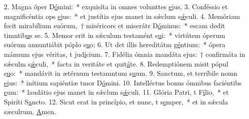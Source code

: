 2. Magna óper D\uline{ó}mini:~* exquisíta in omnes volunttes \uline{e}jus.
3. Conféssio et magnificéntia ops \uline{e}jus:~* et justítia ejus manet in sǽclum s\uline{ǽ}culi.
4. Memóriam fecit mirabílium suórum,~† miséricors et miserátr D\uline{ó}minus:~* escam dedit timntib\uline{u}s se.
5. Memor erit in sǽculum testamént s\uline{u}i:~* virtútem óperum suórum annuntiábit póplo s\uline{u}o:
6. Ut det illis hereditátm g\uline{é}ntium:~* ópera mánuum ejus véritas, t jud\uline{í}cium.
7. Fidélia ómnia mandáta ejus:~† confirmáta in sǽculm s\uline{ǽ}culi,~* facta in veritáte et quit\uline{á}te.
8. Redemptiónem misit pópul s\uline{u}o:~* mandávit in ætérnum testamntum s\uline{u}um.
9. Sanctum, et terríbile nomn \uline{e}jus:~* inítium sapiéntiæ tmor D\uline{ó}mini.
10. Intelléctus bonus ómnibus faciéntibs \uline{e}um:~* laudátio ejus manet in sǽclum s\uline{ǽ}culi.
11. Glória Patri, t F\uline{í}lio,~* et Spiríti S\uline{a}ncto.
12. Sicut erat in princípio, et nunc, t s\uline{e}mper,~* et in sǽcula sæculrum. \uline{A}men.
